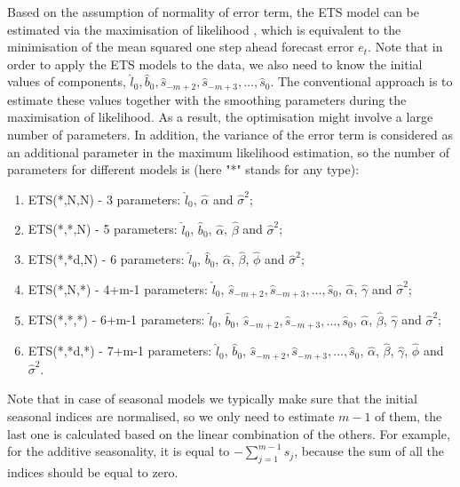 \documentclass[
]{book}
\providecommand{\tightlist}{%
  \setlength{\itemsep}{0pt}\setlength{\parskip}{0pt}}
\theoremstyle{definition}
\theoremstyle{definition}
\theoremstyle{definition}
\theoremstyle{definition}
\theoremstyle{remark}
\begin{document}
Based on the assumption of normality of error term, the ETS model can be estimated via the maximisation of likelihood \citep[see Chapter 13 of][]{SvetunkovSBA}, which is equivalent to the minimisation of the mean squared one step ahead forecast error \(e_t\). Note that in order to apply the ETS models to the data, we also need to know the initial values of components, \(\hat{l}_0, \hat{b}_0, \hat{s}_{-m+2}, \hat{s}_{-m+3}, \dots, \hat{s}_{0}\). The conventional approach is to estimate these values together with the smoothing parameters during the maximisation of likelihood. As a result, the optimisation might involve a large number of parameters. In addition, the variance of the error term is considered as an additional parameter in the maximum likelihood estimation, so the number of parameters for different models is (here "*" stands for any type):

\begin{enumerate}
\def\labelenumi{\arabic{enumi}.}
\tightlist
\item
  ETS(*,N,N) - 3 parameters: \(\hat{l}_0\), \(\hat{\alpha}\) and \(\hat{\sigma}^2\);
\item
  ETS(*,*,N) - 5 parameters: \(\hat{l}_0\), \(\hat{b}_0\), \(\hat{\alpha}\), \(\hat{\beta}\) and \(\hat{\sigma}^2\);
\item
  ETS(*,*d,N) - 6 parameters: \(\hat{l}_0\), \(\hat{b}_0\), \(\hat{\alpha}\), \(\hat{\beta}\), \(\hat{\phi}\) and \(\hat{\sigma}^2\);
\item
  ETS(*,N,*) - 4+m-1 parameters: \(\hat{l}_0\), \(\hat{s}_{-m+2}, \hat{s}_{-m+3}, \dots, \hat{s}_{0}\), \(\hat{\alpha}\), \(\hat{\gamma}\) and \(\hat{\sigma}^2\);
\item
  ETS(*,*,*) - 6+m-1 parameters: \(\hat{l}_0\), \(\hat{b}_0\), \(\hat{s}_{-m+2}, \hat{s}_{-m+3}, \dots, \hat{s}_{0}\), \(\hat{\alpha}\), \(\hat{\beta}\), \(\hat{\gamma}\) and \(\hat{\sigma}^2\);
\item
  ETS(*,*d,*) - 7+m-1 parameters: \(\hat{l}_0\), \(\hat{b}_0\), \(\hat{s}_{-m+2}, \hat{s}_{-m+3}, \dots, \hat{s}_{0}\), \(\hat{\alpha}\), \(\hat{\beta}\), \(\hat{\gamma}\), \(\hat{\phi}\) and \(\hat{\sigma}^2\).
\end{enumerate}

Note that in case of seasonal models we typically make sure that the initial seasonal indices are normalised, so we only need to estimate \(m-1\) of them, the last one is calculated based on the linear combination of the others. For example, for the additive seasonality, it is equal to \(-\sum_{j=1}^{m-1} s_j\), because the sum of all the indices should be equal to zero.
\end{document}
